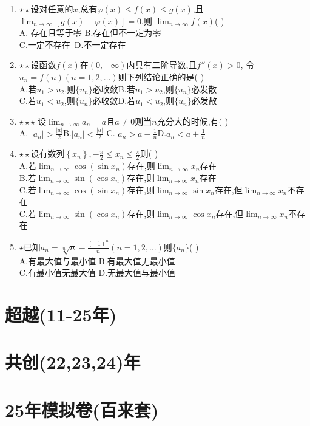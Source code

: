 \documentclass[12pt, a4paper, oneside, UTF8]{ctexbook}
\begin{document}
\begin{enumerate}
    \item $\star\star$设对任意的$x$,总有$\varphi(x)\leq f(x)\leq g(x)$,且$\displaystyle \lim_{n\to\infty}\left[g(x)-\varphi(x)\right]=0$,则
    $\displaystyle\lim_{n\to\infty}f(x)$(   )  \\
    A. 存在且等于零 \qquad B.存在但不一定为零 \\
    C.一定不存在\qquad\quad\ D.不一定存在 

    \item $\star\star$设函数$f(x)$在$(0,+\infty)$内具有二阶导数,且$f''(x)>0$,
    令$u_n=f(n)(n=1,2,\ldots)$则下列结论正确的是(  ) \\
    A.若$u_1>u_2$,则$\{u_n\}$必收敛\qquad B.若$u_1>u_2$,则$\{u_n\}$必发散\\
    C.若$u_1<u_2$,则$\{u_n\}$必收敛\qquad D.若$u_1<u_2$,则$\{u_n\}$必发散

    \item $\star\star\star$ 设$\displaystyle\lim_{n\to\infty}a_n=a$且$a\neq 0$则当$n$充分大的时候,有(   )\\
    A. $\left|a_n\right|>\frac{\left|a\right|}{2}$\qquad B.$\left|a_n\right|<\frac{\left|a\right|}{2}$\qquad
    C. $a_n>a-\frac{1}{n}$\qquad D.$a_n<a+\frac{1}{n}$

    \item $\star\star$设有数列$\left\{x_n\right\},-\frac{\pi}{2}\leq x_n\leq \frac{\pi}{2}$则(    )\\
    A.若$\displaystyle\lim_{n\to\infty}\cos{(\sin{x_n})}$存在,则$\displaystyle\lim_{n\to\infty}x_n$存在 \\
    B.若$\displaystyle\lim_{n\to\infty}\sin{(\cos{x_n})}$存在,则$\displaystyle\lim_{n\to\infty}x_n$存在 \\
    C.若$\displaystyle\lim_{n\to\infty}\cos{(\sin{x_n})}$存在,则$\displaystyle\lim_{n\to\infty}\sin{x_n}$存在,但$\displaystyle\lim_{n\to\infty}x_n$不存在 \\
    C.若$\displaystyle\lim_{n\to\infty}\sin{(\cos{x_n})}$存在,则$\displaystyle\lim_{n\to\infty}\cos{x_n}$存在,但$\displaystyle\lim_{n\to\infty}x_n$不存在

    \item $\star$已知$a_n=\sqrt[n]{n}-\frac{(-1)^n}{n}(n=1,2,\ldots)$则$\{a_n\}$(    )\\
    A.有最大值与最小值 \qquad B.有最大值无最小值\\ 
    C.有最小值无最大值 \qquad D.无最大值与最小值
\end{enumerate}

\section{超越(11-25年)}

\section{共创(22,23,24)年}

\section{25年模拟卷(百来套)}

\ifx\allfiles\undefined
\end{document}
